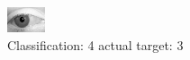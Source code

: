 \begin{figure}[h!]
\begin{center}
\includegraphics[width=0.60\columnwidth]{figures/ID2816_class_4_target_3.png}
\end{center}
\caption{ Classification: 4 actual target: 3}
\label{fig:ID2816_class_4_target_3}
\end{figure}
